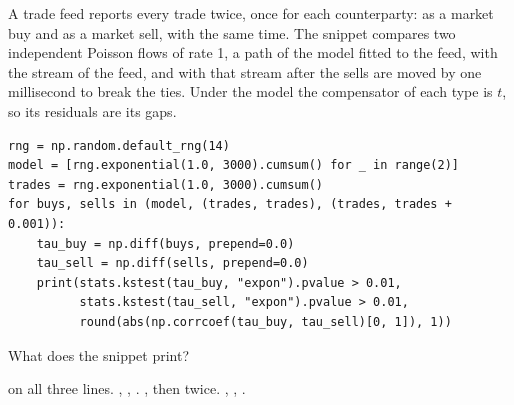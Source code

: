 \begin{question}
\label{question.tradesReportedOnBothSides}
A trade feed reports every trade twice, once for each counterparty:
as a market buy and as a market sell, with the same time.
The snippet compares two independent Poisson flows of rate 1, a path of the model fitted to the feed,
with the stream of the feed,
and with that stream after the sells are moved by one millisecond to break the ties.
Under the model the compensator of each type is $t$,
so its residuals are its gaps.
\begin{lstlisting}[caption={Two margins and a correlation, on three streams}, label=listing.tradesReportedTwice]
rng = np.random.default_rng(14)
model = [rng.exponential(1.0, 3000).cumsum() for _ in range(2)]
trades = rng.exponential(1.0, 3000).cumsum()
for buys, sells in (model, (trades, trades), (trades, trades + 0.001)):
    tau_buy = np.diff(buys, prepend=0.0)
    tau_sell = np.diff(sells, prepend=0.0)
    print(stats.kstest(tau_buy, "expon").pvalue > 0.01,
          stats.kstest(tau_sell, "expon").pvalue > 0.01,
          round(abs(np.corrcoef(tau_buy, tau_sell)[0, 1]), 1))
\end{lstlisting}
What does the snippet print?
\begin{choices}
 \choice {} on all three lines.
 \choice {}, , .
 \correctchoice {}, then  twice.
 \choice {}, , .
\end{choices}
\end{question}

